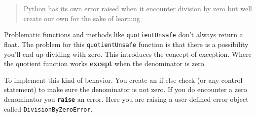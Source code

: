\begin{Shaded}
\begin{Highlighting}[]
\OperatorTok{{-}{-}{-}{-}{-}{-}{-}{-}{-}{-}{-}{-}{-}{-}{-}{-}{-}{-}{-}{-}{-}{-}{-}{-}{-}{-}{-}{-}{-}{-}{-}{-}{-}{-}{-}{-}{-}{-}{-}{-}{-}{-}{-}{-}{-}{-}{-}{-}{-}{-}{-}{-}{-}{-}{-}{-}{-}{-}{-}{-}{-}{-}{-}{-}{-}{-}{-}{-}{-}{-}{-}{-}{-}{-}{-}}
       \NormalTok{,}\NormalTok{))}
\OperatorTok{{-}{-}{-}{-}\textgreater{}}  \NormalTok{,}\NormalTok{))}
       \NormalTok{(}\NormalTok{)}

       \NormalTok{) }\OperatorTok{{-}\textgreater{}} \NormalTok{:}
\OperatorTok{{-}{-}{-}{-}\textgreater{}}      \OperatorTok{/}
       \NormalTok{,}\NormalTok{))}
       \NormalTok{,}\NormalTok{))}

\end{Highlighting}
\end{Shaded}

\begin{quote}
Python has its own error raised when it encounter division by zero but
well create our own for the sake of learning
\end{quote}

Problematic functions and methods like \texttt{quotientUnsafe} don't
always return a float. The problem for this \texttt{quotientUnsafe}
function is that there is a possibility you'll end up dividing with
zero. This introduces the concept of exception. Where the quotient
function works \textbf{except} when the denominator is zero.

To implement this kind of behavior. You create an if-else check (or any
control statement) to make sure the denominator is not zero. If you do
encounter a zero denominator you \textbf{\texttt{raise}} an error. Here
you are raising a user defined error object called
\texttt{DivisionByZeroError}.

